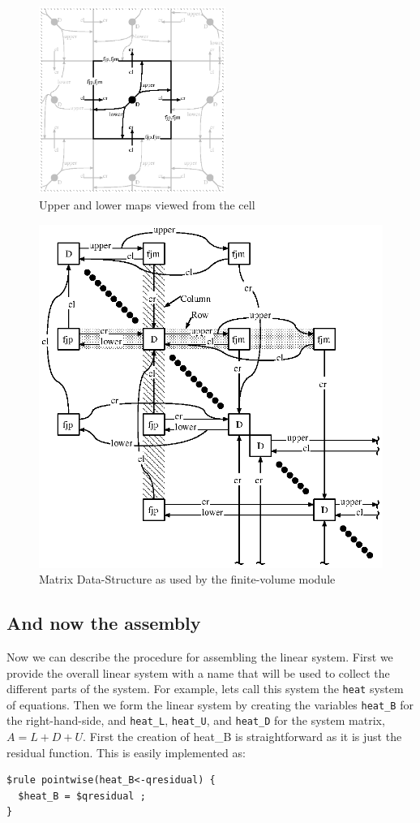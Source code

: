 \documentclass[10pt,epsf,letterpaper,twoside]{book}
\begin{document}
\begin{figure}[htbp]
 \centerline{
\includegraphics[width=2.4in]{figures/cell.eps}}
 \caption{Upper and lower maps viewed from the cell}
\label{cellperspective}
\end{figure}

\begin{figure}[htbp]
 \centerline{
\includegraphics[width=4.5in]{figures/mat.eps}}
 \caption{Matrix Data-Structure as used by the finite-volume module}
\label{matrixperspective}
\end{figure}
\subsection{And now the assembly}

Now we can describe the procedure for assembling the linear system.
First we provide the overall linear system with a name that will be
used to collect the different parts of the system.  For example, lets
call this system the {\tt heat} system of equations.  Then we form the
linear system by creating the variables {\tt heat\_B} for the
right-hand-side, and {\tt heat\_L}, {\tt heat\_U}, and {\tt heat\_D}
for the system matrix, $A=L+D+U$.  First the creation of heat\_B is
straightforward as it is just the residual function.  This is easily
implemented as:
\begin{verbatim}
$rule pointwise(heat_B<-qresidual) {
  $heat_B = $qresidual ;
}
\end{verbatim}
\end{document}
